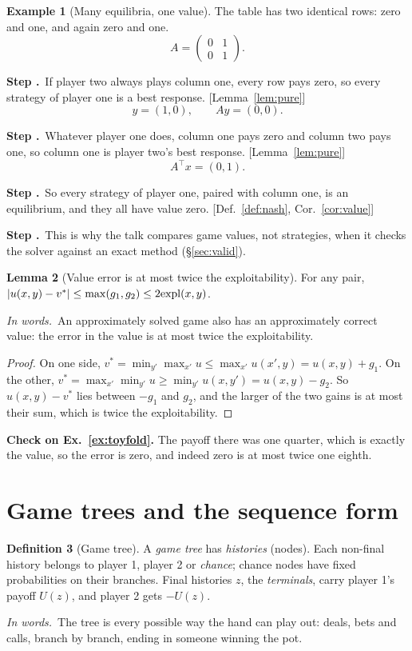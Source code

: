 \documentclass[11pt]{article}
\theoremstyle{definition}
\newtheorem{definition}{Definition}[section]
\newtheorem{example}[definition]{Example}
\newtheorem{lemma}[definition]{Lemma}
\newcommand{\inwords}{\par\smallskip\noindent\textit{In words.}\ }
\newcounter{stp}
\newcommand{\steps}{\setcounter{stp}{0}}
\newcommand{\st}{\stepcounter{stp}\par\medskip\noindent\textbf{Step \arabic{stp}.}\ }
\newcommand{\by}[1]{\hfill{\small\color{blue!50!black}[#1]}}
\newcommand{\Def}[1]{Def.~\ref{#1}}\newcommand{\Lem}[1]{Lemma~\ref{#1}}\newcommand{\Thm}[1]{Thm.~\ref{#1}}
\newcommand{\Ex}[1]{Ex.~\ref{#1}}\newcommand{\Rem}[1]{Remark~\ref{#1}}\newcommand{\Alg}[1]{Alg.~\ref{#1}}\newcommand{\Cor}[1]{Cor.~\ref{#1}}
\begin{document}
\begin{example}[Many equilibria, one value]\label{ex:nonunique}
The table has two identical rows: zero and one, and again zero and one.
\[ A=\begin{pmatrix}0&1\\0&1\end{pmatrix}. \]
\steps
\st If player two always plays column one, every row pays zero, so every strategy of player one is a best response.
\by{\Lem{lem:pure}}
\[ y=(1,0),\qquad Ay=(0,0). \]
\st Whatever player one does, column one pays zero and column two pays one, so column one is player two's best response.
\by{\Lem{lem:pure}}
\[ A^\top x=(0,1). \]
\st So every strategy of player one, paired with column one, is an equilibrium, and they all have value zero.
\by{\Def{def:nash}, \Cor{cor:value}}
\st This is why the talk compares game values, not strategies, when it checks the solver against an exact method
(\S\ref{sec:valid}).
\end{example}

\begin{lemma}[Value error is at most twice the exploitability]\label{lem:valgap}
For any pair, $|u(x,y)-v^\ast|\le\max(g_1,g_2)\le2\mathrm{expl}(x,y)$.
\inwords An approximately solved game also has an approximately correct value: the error in the value is at most twice
the exploitability.
\end{lemma}
\begin{proof}
On one side, $v^\ast=\min_{y'}\max_{x'}u\le\max_{x'}u(x',y)=u(x,y)+g_1$. On the other, $v^\ast=\max_{x'}\min_{y'}u\ge\min_{y'}u(x,y')=u(x,y)-g_2$.
So $u(x,y)-v^\ast$ lies between $-g_1$ and $g_2$, and the larger of the two gains is at most their sum, which is twice the
exploitability.
\end{proof}
\textbf{Check on \Ex{ex:toyfold}.} The payoff there was one quarter, which is exactly the value, so the error is zero, and
indeed zero is at most twice one eighth.

\section{Game trees and the sequence form}\label{sec:tree}
\begin{definition}[Game tree]\label{def:tree}
A \emph{game tree} has \emph{histories} (nodes). Each non-final history belongs to player 1, player 2 or \emph{chance};
chance nodes have fixed probabilities on their branches. Final histories $z$, the \emph{terminals}, carry player 1's
payoff $U(z)$, and player 2 gets $-U(z)$.
\inwords The tree is every possible way the hand can play out: deals, bets and calls, branch by branch, ending in someone
winning the pot.
\end{definition}
\end{document}
